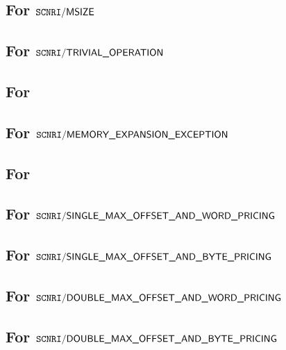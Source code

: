 \subsection{For $\texttt{SCNRI}\textsf{/}{\textsf{MSIZE}}$}                               \label{mxp: computation: msize}                               
\subsection{For $\texttt{SCNRI}\textsf{/}{\textsf{TRIVIAL\_OPERATION}}$}                    \label{mxp: computation: trivial}                                                               
\subsection{For \locMxpScenarioNonTrivialOperation}                \label{mxp: computation: nontrivial}                          
\subsection{For $\texttt{SCNRI}\textsf{/}{\textsf{MEMORY\_EXPANSION\_EXCEPTION}}$}            \label{mxp: computation: mxpx}                                
\subsection{For \locMxpScenarioNonTrivialNonMxpx}                  \label{mxp: computation: nontrivial_unexceptional}                                                                        
\subsection{For $\texttt{SCNRI}\textsf{/}{\textsf{SINGLE\_MAX\_OFFSET\_AND\_WORD\_PRICING}}$}       \label{mxp: computation: single_max_offset_word}              
\subsection{For $\texttt{SCNRI}\textsf{/}{\textsf{SINGLE\_MAX\_OFFSET\_AND\_BYTE\_PRICING}}$}       \label{mxp: computation: single_max_offset_byte}                          
\subsection{For $\texttt{SCNRI}\textsf{/}{\textsf{DOUBLE\_MAX\_OFFSET\_AND\_WORD\_PRICING}}$}       \label{mxp: computation: double_max_offset_word}              
\subsection{For $\texttt{SCNRI}\textsf{/}{\textsf{DOUBLE\_MAX\_OFFSET\_AND\_BYTE\_PRICING}}$}       \label{mxp: computation: double_max_offset_byte}              
